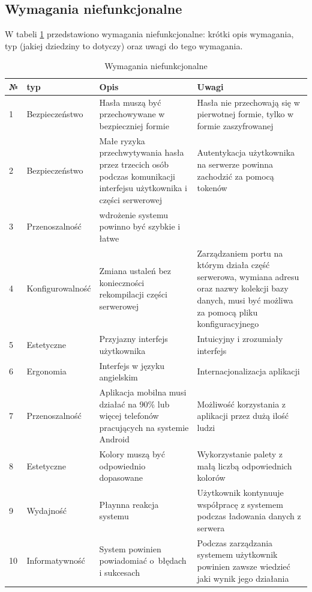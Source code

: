 \subsection{Wymagania niefunkcjonalne}
W tabeli \ref{tab:wymaganianiefunkcjonalne} przedstawiono wymagania niefunkcjonalne: krótki opis wymagania, typ (jakiej dziedziny to dotyczy) oraz uwagi do tego wymagania.
\begin{table}[htb] \small
\centering
    \caption{Wymagania niefunkcjonalne}
    \label{tab:wymaganianiefunkcjonalne}
    \begin{tabularx}{\linewidth}{| l| l |X | X |} 
    \hline
    № & typ & Opis & Uwagi \\
    \hline
    1 & Bezpieczeństwo & Hasła muszą być przechowywane w bezpieczniej formie & Hasła nie przechowają się w pierwotnej formie, tylko w formie zaszyfrowanej \\ 
    \hline
    2 & Bezpieczeństwo & Małe ryzyka przechwytywania hasła przez trzecich osób podczas komunikacji interfejsu użytkownika i części serwerowej & Autentykacja użytkownika na serwerze powinna zachodzić za pomocą tokenów \\ 
    \hline
    3 & Przenoszalność & wdrożenie systemu powinno być szybkie i łatwe & \\ 
    \hline
    4 & Konfigurowalność & Zmiana ustaleń bez konieczności rekompilacji części serwerowej & Zarządzaniem portu na którym działa część serwerowa, wymiana adresu oraz nazwy kolekcji bazy danych, musi być możliwa za pomocą pliku konfiguracyjnego \\ 
    \hline
    5 & Estetyczne & Przyjazny interfejs użytkownika & Intuicyjny i zrozumiały interfejs \\ 
    \hline
    6 & Ergonomia & Interfejs w języku angielskim & Internacjonalizacja aplikacji \\
    \hline
    7 & Przenoszalność & Aplikacja mobilna musi działać na 90\% lub więcej telefonów pracujących na systemie Android & Możliwość korzystania z aplikacji przez dużą ilość ludzi \\
    \hline
    8 & Estetyczne & Kolory muszą być odpowiednio dopasowane & Wykorzystanie palety z małą liczbą odpowiednich kolorów  \\
    \hline
    9 & Wydajność & Płaynna reakcja systemu & Użytkownik kontynuuje współpracę z systemem podczas ładowania danych z serwera \\ %
    \hline
    10 & Informatywność & System powinien powiadomiać o~błędach i sukcesach  & Podczas zarządzania systemem użytkownik powinien zawsze wiedzieć jaki wynik jego działania \\

\end{tabularx}
\end{table}
